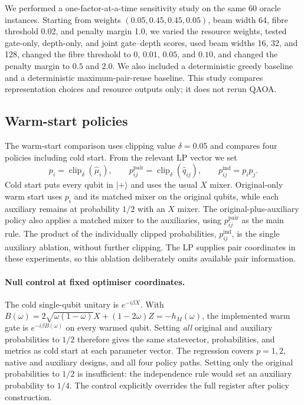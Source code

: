 \documentclass[a4paper,onecolumn,11pt,unpublished]{quantumarticle}
\theoremstyle{remark}
\begin{document}
We performed a one-factor-at-a-time sensitivity study on the same 60 oracle
instances.  Starting from weights $(0.05,0.45,0.45,0.05)$, beam width 64,
fibre threshold 0.02, and penalty margin 1.0, we varied the resource weights,
tested gate-only, depth-only, and joint gate--depth scores, used beam widths
16, 32, and 128, changed the fibre threshold to $0$, $0.01$, $0.05$, and
$0.10$, and changed the penalty margin to $0.5$ and $2.0$.  We also included
a deterministic greedy baseline and a deterministic maximum-pair-reuse
baseline.  This study compares representation choices and resource outputs
only; it does not rerun QAOA.

\subsection{Warm-start policies}
\label{app:experimental-warm}

The warm-start comparison uses clipping value $\delta=0.05$ and compares four policies including cold start. From the relevant LP vector we set
\begin{equation}
  p_i=\operatorname{clip}_\delta(\widehat\mu_i),
  \qquad
  p_{ij}^{\mathrm{pair}}
  =\operatorname{clip}_\delta(\widehat q_{ij}),
  \qquad
  p_{ij}^{\mathrm{ind}}=p_i p_j.
  \label{eq:experimental-warm-probabilities}
\end{equation}
Cold start puts every qubit in $|+\rangle$ and uses the usual $X$ mixer.
Original-only warm start uses $p_i$ and its matched mixer on the original
qubits, while each auxiliary remains at probability $1/2$ with an $X$ mixer.
The original-plus-auxiliary policy also applies a matched mixer to the
auxiliaries, using $p_{ij}^{\mathrm{pair}}$ as the main rule.  The product of
the individually clipped probabilities, $p_{ij}^{\mathrm{ind}}$, is the single
auxiliary ablation, without further clipping. The LP supplies pair coordinates
in these experiments, so this ablation deliberately omits available pair
information.

\paragraph{Null control at fixed optimiser coordinates.}
The cold single-qubit unitary is $e^{-i\beta X}$. With
$B(\omega)=2\sqrt{\omega(1-\omega)}X+(1-2\omega)Z=-h_M(\omega)$,
the implemented warm gate is $e^{-i\beta B(\omega)}$ on every warmed
qubit. Setting \emph{all} original and auxiliary probabilities to $1/2$
therefore gives the same statevector, probabilities, and metrics as cold
start at each parameter vector. The regression covers $p=1,2$, native and
auxiliary designs, and all four policy paths. Setting only the original
probabilities to $1/2$ is insufficient: the independence rule would set an
auxiliary probability to $1/4$. The control explicitly overrides the full
register after policy construction.
\end{document}
